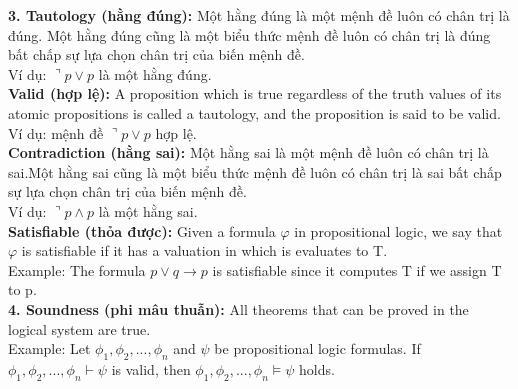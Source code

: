 \documentclass[a4paper]{article}
\begin{document}
\textbf{{\large\hspace{1 cm} 3. Tautology (hằng đúng): }}{\large Một hằng đúng là một mệnh đề luôn có chân trị là đúng. Một hằng đúng cũng là một biểu thức mệnh đề luôn có chân trị là đúng bất chấp sự lựa chọn chân trị của biến mệnh đề.\\

\hspace{1.5 cm} Ví dụ: $\urcorner p \vee p$ là một hằng đúng.
}\\

\textbf{{\large\hspace{1.5 cm} Valid (hợp lệ): }}
{\large A proposition which is true regardless of the truth values of its atomic propositions is called a tautology, and the proposition is said to be valid.\\

\hspace{1.5 cm} Ví dụ: mệnh đề $\urcorner p \vee p$ hợp lệ.}\\

\textbf{{\large\hspace{1.5 cm} Contradiction (hằng sai): }}{\large Một hằng sai là một mệnh đề luôn có chân trị là sai.Một hằng sai cũng là một biểu thức mệnh đề luôn có chân trị là sai bất chấp sự lựa chọn chân trị của biến mệnh đề.\\

\hspace{1.5 cm} Ví dụ: $\urcorner p \wedge p$ là một hằng sai.}\\

\textbf{{\large\hspace{1.5 cm} Satisfiable (thỏa được): }}
{\large Given a formula $\varphi$ in propositional logic, we say that $\varphi$ is satisfiable if it has a valuation in which is evaluates to T.\\

\hspace{1.5 cm} Example: The formula $p \vee q \rightarrow p$ is satisfiable since it computes T if we
assign T to p.}\\

\textbf{{\large\hspace{1 cm} 4. Soundness (phi mâu thuẫn): }}
{\large All theorems that can be proved in the logical system are true.\\

\hspace{1.5 cm} Example: Let $\phi_{1},\phi_{2}, . . . , \phi_{n}$ and $\psi$ be propositional logic formulas. If $\phi_{1},\phi_{2}, . . . , \phi_{n} \vdash \psi$ is valid, then $\phi_{1},\phi_{2}, . . . , \phi_{n} \models \psi$ holds.}\\
\end{document}
